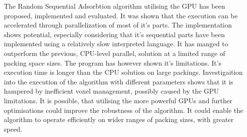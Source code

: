 \documentclass[12pt, oneside]{report}
\begin{document}
The Random Sequential Adsorbtion algorithm utilising the GPU has been proposed, implemented and evaluated. It was shown that the execution can be accelerated through parallelization of most of it's parts. The implementation shows potential, especially considering that it's sequential parts have been implemented using a relatively slow interpreted language. It has manged to outperform the previous, CPU-level parallel, solution at a limited range of packing space sizes. \newline
The program has however shown it's limitations. It's execution time is longer than the CPU solution on large packings. Investigaition into the execution of the algorithm with different parameters shows that it is hampered by inefficient voxel management, possibly caused by the GPU limitations. It is possible, that utilising the more powerful GPUs and further optimisations could improve the robustness of the algorithm. It could enable the algorithm to operate efficiently on wider ranges of packing sizes, with greater speed.


\newpage
\printbibliography
\end{document}
